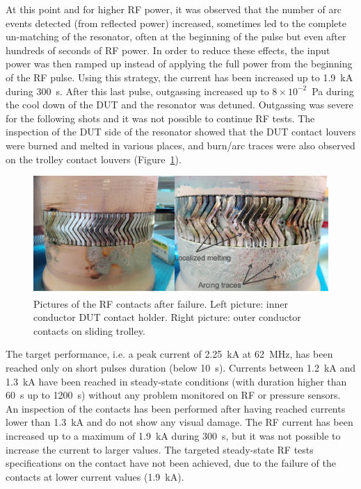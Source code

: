 {At this point and for higher RF power, it was observed that the number of arc events detected (from reflected power) increased, sometimes led to the complete un-matching of the resonator, often at the beginning of the pulse but even after hundreds of seconds of RF power. In order to reduce these effects, the input power was then ramped up instead of applying the full power from the beginning of the RF pulse. Using this strategy, the current has been increased up to 1.9~kA during 300~s. After this last pulse, outgassing increased up to $8\times 10^{-2}$~Pa during the cool down of the DUT and the resonator was detuned. Outgassing was severe for the following shots and it was not possible to continue RF tests. The inspection of the DUT side of the resonator showed that the DUT contact louvers were burned and melted in various places, and burn/arc traces were also observed on the trolley contact louvers (Figure~\ref{fig:rfcontactlacutmelt}). 


\begin{figure}[h]
	\centering
	\includegraphics[width=1.0\linewidth]{figures/chap3/RF_contacts/RF_contact_LACUT_melt}
	\caption{Pictures of the RF contacts after failure. Left picture: inner conductor DUT contact holder. Right picture: outer conductor contacts on sliding trolley.}
	\label{fig:rfcontactlacutmelt}
\end{figure}

The target performance, i.e. a peak current of 2.25~kA at 62~MHz, has been reached only on short pulses duration (below 10~s). Currents between 1.2~kA and 1.3~kA have been reached in steady-state conditions (with duration higher than 60~s up to 1200~s) without any problem monitored on RF or pressure sensors. An inspection of the contacts has been performed after having reached currents lower than 1.3~kA and do not show any visual damage. The RF current has been increased up to a maximum of 1.9~kA during 300~s, but it was not possible to increase the current to larger values. The targeted steady-state RF tests specifications on the contact have not been achieved, due to the failure of the contacts at lower current values (1.9~kA). 

}

